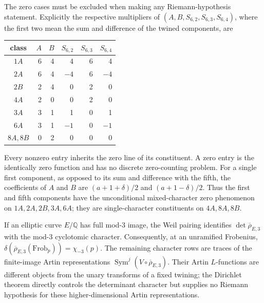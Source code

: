 The zero cases must be excluded when making any Riemann-hypothesis
statement.  Explicitly the respective multipliers of
$(A,B,S_{6,2},S_{6,3},S_{6,4})$, where the first two mean the sum and
difference of the twined components, are
\begin{center}
\begin{tabular}{c|rrrrr}
class&$A$&$B$&$S_{6,2}$&$S_{6,3}$&$S_{6,4}$\\\hline
$1A$&6&4&4&6&4\\
$2A$&6&4&$-4$&6&$-4$\\
$2B$&2&4&0&2&0\\
$4A$&2&0&0&2&0\\
$3A$&3&1&1&0&1\\
$6A$&3&1&$-1$&0&$-1$\\
$8A,8B$&0&2&0&0&0
\end{tabular}
\end{center}
Every nonzero entry inherits the zero line of its constituent.  A zero entry
is the identically zero function and has no discrete zero-counting problem.
For a single first component, as opposed to its sum and difference with the
fifth, the coefficients of $A$ and $B$ are
$(a+1+\delta)/2$ and $(a+1-\delta)/2$.
Thus the first and fifth components have the unconditional mixed-character
zero phenomenon on $1A,2A,2B,3A,6A$; they are single-character constituents
on $4A,8A,8B$.

If an elliptic curve $E/\mathbb Q$ has full mod-$3$ image, the Weil pairing
identifies $\det\overline\rho_{E,3}$ with the mod-$3$ cyclotomic character.
Consequently, at an unramified Frobenius,
$\delta(\overline\rho_{E,3}(\mathrm{Frob}_p))=\chi_{-3}(p)$.
The remaining character rows are traces of the finite-image Artin
representations $\operatorname{Sym}^j(V\circ\overline\rho_{E,3})$.
Their Artin $L$-functions are different objects from the unary transforms
of a fixed twining; the Dirichlet theorem directly controls the determinant
character but supplies no Riemann hypothesis for these higher-dimensional
Artin representations.

